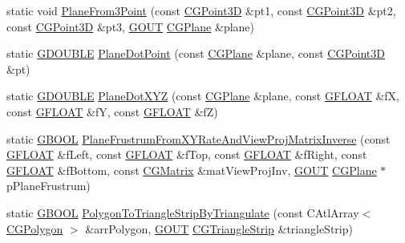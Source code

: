 \begin{DoxyCompactItemize}
\item 
static void \hyperlink{class_c_g_math_a129bf3db1c4cc7ad8a314ca624443daa}{Plane\+From3\+Point} (const \hyperlink{class_c_g_point3_d}{C\+G\+Point3\+D} \&pt1, const \hyperlink{class_c_g_point3_d}{C\+G\+Point3\+D} \&pt2, const \hyperlink{class_c_g_point3_d}{C\+G\+Point3\+D} \&pt3, \hyperlink{_g_types_8h_a0858ec221262e635612871d70ca233ad}{G\+O\+U\+T} \hyperlink{class_c_g_plane}{C\+G\+Plane} \&plane)
\item 
static \hyperlink{_g_types_8h_afd05ac85f90ee8e2a733928545462cd4}{G\+D\+O\+U\+B\+L\+E} \hyperlink{class_c_g_math_a52b9ce20a6668cd63b16b9bd6ac66980}{Plane\+Dot\+Point} (const \hyperlink{class_c_g_plane}{C\+G\+Plane} \&plane, const \hyperlink{class_c_g_point3_d}{C\+G\+Point3\+D} \&pt)
\item 
static \hyperlink{_g_types_8h_afd05ac85f90ee8e2a733928545462cd4}{G\+D\+O\+U\+B\+L\+E} \hyperlink{class_c_g_math_a882da02bd111efff6617717cd311ba2a}{Plane\+Dot\+X\+Y\+Z} (const \hyperlink{class_c_g_plane}{C\+G\+Plane} \&plane, const \hyperlink{_g_types_8h_abf6eba8223df62f199b811a6c52ff2ef}{G\+F\+L\+O\+A\+T} \&f\+X, const \hyperlink{_g_types_8h_abf6eba8223df62f199b811a6c52ff2ef}{G\+F\+L\+O\+A\+T} \&f\+Y, const \hyperlink{_g_types_8h_abf6eba8223df62f199b811a6c52ff2ef}{G\+F\+L\+O\+A\+T} \&f\+Z)
\item 
static \hyperlink{_g_types_8h_a2901915743626352a6820c5405f556dc}{G\+B\+O\+O\+L} \hyperlink{class_c_g_math_a617307dee1011495bfbd82d1c6782ba6}{Plane\+Frustrum\+From\+X\+Y\+Rate\+And\+View\+Proj\+Matrix\+Inverse} (const \hyperlink{_g_types_8h_abf6eba8223df62f199b811a6c52ff2ef}{G\+F\+L\+O\+A\+T} \&f\+Left, const \hyperlink{_g_types_8h_abf6eba8223df62f199b811a6c52ff2ef}{G\+F\+L\+O\+A\+T} \&f\+Top, const \hyperlink{_g_types_8h_abf6eba8223df62f199b811a6c52ff2ef}{G\+F\+L\+O\+A\+T} \&f\+Right, const \hyperlink{_g_types_8h_abf6eba8223df62f199b811a6c52ff2ef}{G\+F\+L\+O\+A\+T} \&f\+Bottom, const \hyperlink{class_c_g_matrix}{C\+G\+Matrix} \&mat\+View\+Proj\+Inv, \hyperlink{_g_types_8h_a0858ec221262e635612871d70ca233ad}{G\+O\+U\+T} \hyperlink{class_c_g_plane}{C\+G\+Plane} $\ast$p\+Plane\+Frustrum)
\item 
static \hyperlink{_g_types_8h_a2901915743626352a6820c5405f556dc}{G\+B\+O\+O\+L} \hyperlink{class_c_g_math_a137dac2c77a5d11a1ec4e6a731da2dd6}{Polygon\+To\+Triangle\+Strip\+By\+Triangulate} (const C\+Atl\+Array$<$ \hyperlink{_g_polyline3_d_8h_aaff14096de7e2f1a640c0942e4bd70da}{C\+G\+Polygon} $>$ \&arr\+Polygon, \hyperlink{_g_types_8h_a0858ec221262e635612871d70ca233ad}{G\+O\+U\+T} \hyperlink{class_c_g_triangle_strip}{C\+G\+Triangle\+Strip} \&triangle\+Strip)

\end{DoxyCompactItemize}
